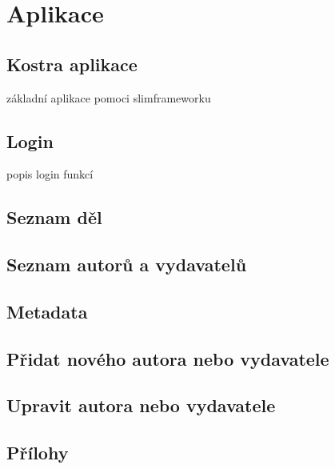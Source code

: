             
            
    \section{Aplikace}
    
        \subsection{Kostra aplikace}
            základní aplikace pomoci slimframeworku
            
        \subsection{Login}
            popis login funkcí
            
        \subsection{Seznam děl}

        \subsection{Seznam autorů a vydavatelů}
        
        \subsection{Metadata}
        
        \subsection{Přidat nového autora nebo vydavatele}
        
        \subsection{Upravit autora nebo vydavatele}

        \subsection{Přílohy}



